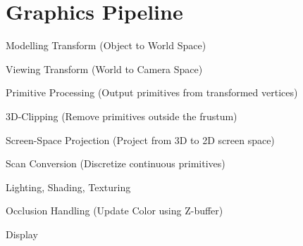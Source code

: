 \section{Graphics Pipeline}

\begin{compactenum}
        \item Modelling Transform (Object to World Space)
        \item Viewing Transform (World to Camera Space)
        \item Primitive Processing (Output primitives from transformed vertices)
        \item 3D-Clipping (Remove primitives outside the frustum)
        \item Screen-Space Projection (Project from 3D to 2D screen space)
        \item Scan Conversion (Discretize continuous primitives)
        \item Lighting, Shading, Texturing
        \item Occlusion Handling (Update Color using Z-buffer)
        \item Display
\end{compactenum}
 \\


